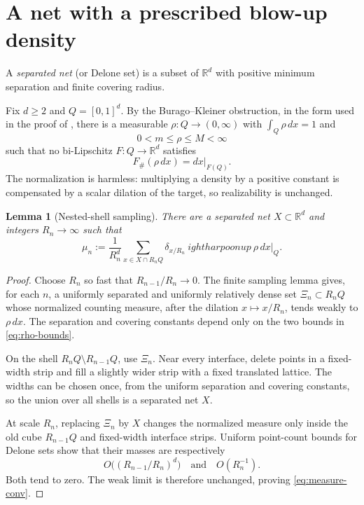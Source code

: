 \documentclass[10pt]{article}
\newtheorem{lemma}{Lemma}
\newcommand{\R}{\mathbb R}
\begin{document}
\section{A net with a prescribed blow-up density}

A \emph{separated net} (or Delone set) is a subset of $\R^d$ with positive
minimum separation and finite covering radius.

Fix $d\ge2$ and $Q=[0,1]^d$.  By the Burago--Kleiner obstruction, in the form
used in the proof of \cite[Theorem 6.1]{DymondKaluza}, there is a measurable
$\rho:Q\to(0,\infty)$ with $\int_Q\rho\,dx=1$ and
\begin{equation}\label{eq:rho-bounds}
 0<m\le\rho\le M<\infty
\end{equation}
such that no bi-Lipschitz $F:Q\to\R^d$ satisfies
\begin{equation}\label{eq:forbidden}
 F_\#(\rho\,dx)=dx|_{F(Q)}.
\end{equation}
The normalization is harmless: multiplying a density by a positive constant
is compensated by a scalar dilation of the target, so realizability is
unchanged.

\begin{lemma}[Nested-shell sampling]\label{lem:sampling}
There are a separated net $X\subset\R^d$ and integers $R_n\to\infty$ such
that
\begin{equation}\label{eq:measure-conv}
 \mu_n:=\frac1{R_n^d}\sum_{x\in X\cap R_nQ}\delta_{x/R_n}
 \ 
ightharpoonup\ \rho\,dx|_Q.
\end{equation}
\end{lemma}

\begin{proof}
Choose $R_n$ so fast that $R_{n-1}/R_n\to0$.  The finite sampling lemma
\cite[Lemma 6.4]{DymondKaluza} gives, for each $n$, a uniformly separated and
uniformly relatively dense set $\Xi_n\subset R_nQ$ whose normalized counting
measure, after the dilation $x\mapsto x/R_n$, tends weakly to $\rho\,dx$.
The separation and covering constants depend only on the two bounds in
\eqref{eq:rho-bounds}.

On the shell $R_nQ\setminus R_{n-1}Q$, use $\Xi_n$.  Near every interface,
delete points in a fixed-width strip and fill a slightly wider strip with a
fixed translated lattice.  The widths can be chosen once, from the uniform
separation and covering constants, so the union over all shells is a
separated net $X$.

At scale $R_n$, replacing $\Xi_n$ by $X$ changes the normalized measure only
inside the old cube $R_{n-1}Q$ and fixed-width interface strips.  Uniform
point-count bounds for Delone sets show that their masses are respectively
\[
 O\bigl((R_{n-1}/R_n)^d\bigr)\quad\text{and}\quad O(R_n^{-1}).
\]
Both tend to zero.  The weak limit is therefore unchanged, proving
\eqref{eq:measure-conv}.
\end{proof}
\end{document}
